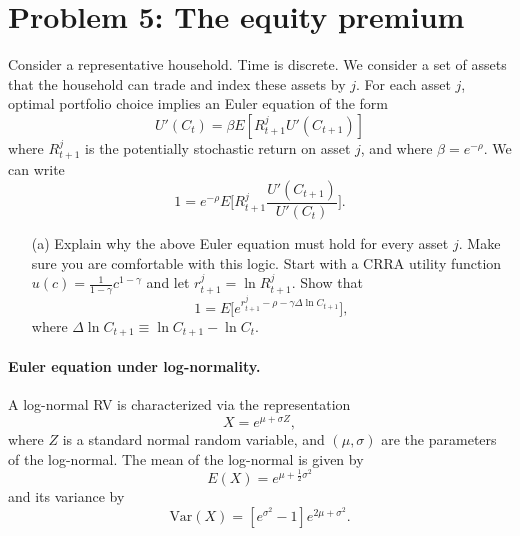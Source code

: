 \documentclass[11pt]{extarticle}
\theoremstyle{plain}
\theoremstyle{definition}
\begin{document}
\vspace{5mm}
\section*{Problem 5: The equity premium}

Consider a representative household. Time is discrete. We consider a set of assets that the household can trade and index these assets by $j$. For each asset $j$, optimal portfolio choice implies an Euler equation of the form
\begin{equation*}
	U'(C_t) = \beta E[R_{t+1}^j U'(C_{t+1})]
\end{equation*}
where $R_{t+1}^j$ is the potentially stochastic return on asset $j$, and where $\beta = e^{-\rho}$. We can write 
\begin{equation*}
	1 = e^{-\rho} E\bigg[R_{t+1}^j \frac{U'(C_{t+1})}{U'(C_t)} \bigg].
\end{equation*}


\begin{enumerate}
\item [(a)] Explain why the above Euler equation must hold for every asset $j$. Make sure you are comfortable with this logic. Start with a CRRA utility function $u(c) = \frac{1}{1-\gamma} c^{1-\gamma}$ and let $r_{t+1}^j = \ln R_{t+1}^j$. Show that
\begin{equation*}
	1 = E\bigg[ e^{r_{t+1}^j - \rho -\gamma \Delta \ln  C_{t+1}} \bigg],
\end{equation*}
where $\Delta \ln C_{t+1} \equiv \ln C_{t+1} - \ln C_t$.
\end{enumerate}


\paragraph{Euler equation under log-normality.} 
A log-normal RV is characterized via the representation
\begin{equation*}
	X = e^{\mu + \sigma Z},
\end{equation*}
where $Z$ is a standard normal random variable, and $(\mu,\sigma)$ are the parameters of the log-normal. The mean of the log-normal is given by
\begin{equation*}
	E(X) = e^{\mu + \frac{1}{2} \sigma^2}
\end{equation*}
and its variance by
\begin{equation*}
	\text{Var}(X) = [e^{\sigma^2}-1] e^{2\mu + \sigma^2}.
\end{equation*}
\end{document}
